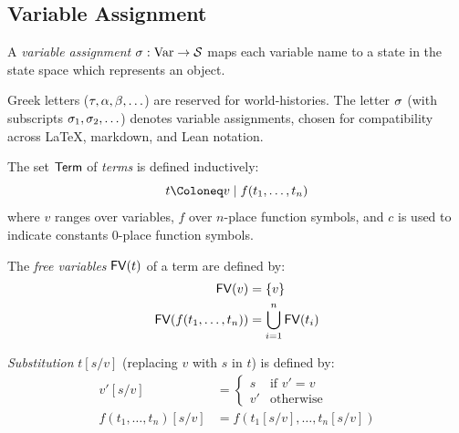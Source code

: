\documentclass[../LogosReference.tex]{subfiles}
\begin{document}

\subsection{Variable Assignment}\label{sec:variable-assignment}

\begin{definition}\label{def:variable-assignment}
	A \emph{variable assignment} $\sigma : \mathrm{Var} \to \mathcal{S}$ maps each variable name to a state in the state space which represents an object.
\end{definition}

\begin{notation}
	Greek letters ($\tau, \alpha, \beta, \ldots$) are reserved for world-histories.
	The letter $\sigma$ (with subscripts $\sigma_1, \sigma_2, \ldots$) denotes variable assignments, chosen for compatibility across \LaTeX, markdown, and Lean notation.
\end{notation}

\begin{definition}\label{def:term-algebra}
The set $\mathsf{Term}$ of \emph{terms} is defined inductively:
\[
	t \Define v \mid f(t_1, \ldots, t_n)
\]
where $v$ ranges over variables, $f$ over $n$-place function symbols, and $c$ is used to indicate constants 0-place function symbols.

The \emph{free variables} $\mathsf{FV}(t)$ of a term are defined by:
\begin{align*}
	\mathsf{FV}(v) &= \{v\} \\
	\mathsf{FV}(f(t_1, \ldots, t_n)) &= \bigcup_{i=1}^n \mathsf{FV}(t_i)
\end{align*}

\emph{Substitution} $t[s/v]$ (replacing $v$ with $s$ in $t$) is defined by:
\begin{align*}
	v'[s/v] &= \begin{cases} s & \text{if } v' = v \\ v' & \text{otherwise} \end{cases} \\
	f(t_1, \ldots, t_n)[s/v] &= f(t_1[s/v], \ldots, t_n[s/v])
\end{align*}
\end{definition}
\end{document}
